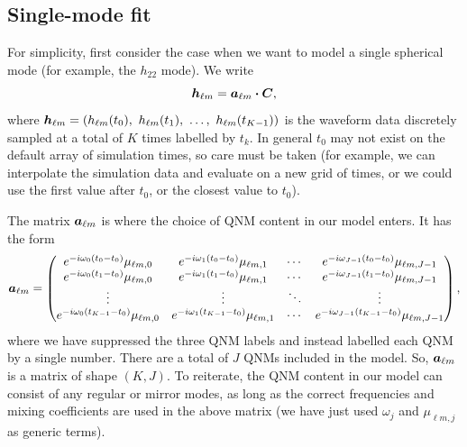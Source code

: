\subsection{Single-mode fit}

For simplicity, first consider the case when we want to model a single spherical mode (for example, the $h_{22}$ mode). We write
\begin{equation}\label{eq:hlm_matrix_single}
    \vb*{h}_{\ell m} = \vb*{a}_{\ell m} \vdot \vb*{C},
\end{equation}
where $\vb*{h}_{\ell m} = \qty(h_{\ell m}(t_0),\ h_{\ell m}(t_1),\ \ldots,\ h_{\ell m}(t_{K-1}))$ is the waveform data discretely sampled at a total of $K$ times labelled by $t_k$. 
In general $t_0$ may not exist on the default array of simulation times, so care must be taken (for example, we can interpolate the simulation data and evaluate on a new grid of times, or we could use the first value after $t_0$, or the closest value to $t_0$). 

The matrix $\vb*{a}_{\ell m}$ is where the choice of QNM content in our model enters. 
It has the form
\begin{equation}
    \vb*{a}_{\ell m} = 
    \begin{pmatrix}
    e^{-i \omega_0 (t_0 - t_0)} \mu_{\ell m,0} & e^{-i \omega_1 (t_0 - t_0)} \mu_{\ell m,1} & \cdots & e^{-i \omega_{J-1} (t_0 - t_0)} \mu_{\ell m,J-1} \\ 
    e^{-i \omega_0 (t_1 - t_0)} \mu_{\ell m,0} & e^{-i \omega_1 (t_1 - t_0)} \mu_{\ell m,1} & \cdots & e^{-i \omega_{J-1} (t_1 - t_0)} \mu_{\ell m,J-1} \\ 
    \vdots & \vdots & \ddots & \vdots \\
    e^{-i \omega_0 (t_{K-1} - t_0)} \mu_{\ell m,0} & e^{-i \omega_1 (t_{K-1} - t_0)} \mu_{\ell m,1} & \cdots & e^{-i \omega_{J-1} (t_{K-1} - t_0)} \mu_{\ell m,J-1}
    \end{pmatrix},
\end{equation}
where we have suppressed the three QNM labels and instead labelled each QNM by a single number. 
There are a total of $J$ QNMs included in the model.
So, $\vb*{a}_{\ell m}$ is a matrix of shape $(K, J)$.
To reiterate, the QNM content in our model can consist of any regular or mirror modes, as long as the correct frequencies and mixing coefficients are used in the above matrix (we have just used $\omega_j$ and $\mu_{\ell m, j}$ as generic terms). 

